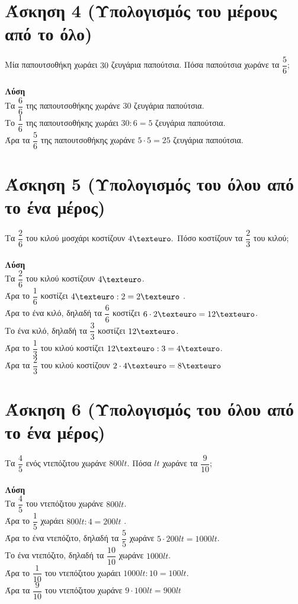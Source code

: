 \documentclass[a4paper,10pt]{report}
\begin{document}
\section*{Άσκηση 4 (Υπολογισμός του μέρους από το όλο)\hfill \small{}}
Μία παπουτσοθήκη χωράει $30$ ζευγάρια παπούτσια. Πόσα παπούτσια χωράνε τα  $\dfrac{5}{6}$; \\ \\
\textbf{Λύση}\\
Τα $\dfrac{6}{6}$ της παπουτσοθήκης χωράνε $30$ ζευγάρια παπούτσια.\\
Το $\dfrac{1}{6}$ της παπουτσοθήκης χωράει $30:6=5$ ζευγάρια παπούτσια.\\
Άρα τα $\dfrac{5}{6}$ της παπουτσοθήκης χωράνε $5\cdot 5=25$ ζευγάρια παπούτσια.




\section*{Άσκηση 5 (Υπολογισμός του όλου από το ένα μέρος)\hfill \small{}}
Τα $\dfrac{2}{6}$ του κιλού μοσχάρι κοστίζουν $4\texteuro.$ Πόσο κοστίζουν τα $\dfrac{2}{3}$ του κιλού;\\ \\
\textbf{Λύση}\\
Τα $\dfrac{2}{6}$ του κιλού κοστίζουν $4\texteuro$.\\
Άρα το $\dfrac{1}{6}$ κοστίζει $4\texteuro:2=2\texteuro$ .\\
     Άρα  το ένα κιλό, δηλαδή τα $\dfrac{6}{6}$ κοστίζει $6\cdot 2\texteuro=12\texteuro$.\\
       Το ένα κιλό, δηλαδή τα $\dfrac{3}{3}$ κοστίζει $12\texteuro$.\\
      Άρα το $\dfrac{1}{3}$ του κιλού κοστίζει $12\texteuro :3=4\texteuro$.\\
       Άρα τα $\dfrac{2}{3}$ του κιλού κοστίζουν $2\cdot 4\texteuro=8\texteuro$

\section*{Άσκηση 6 (Υπολογισμός του όλου από το ένα μέρος)\hfill \small{}}
Τα $\dfrac{4}{5}$ ενός ντεπόζιτου χωράνε  $800lt$. Πόσα $lt$ χωράνε τα $\dfrac{9}{10}$;\\ \\
\textbf{Λύση}\\
Τα $\dfrac{4}{5}$ του ντεπόζιτου χωράνε $800lt$.\\
Άρα το $\dfrac{1}{5}$ χωράει $800lt:4=200lt$ .\\
     Άρα  το ένα ντεπόζιτο, δηλαδή τα $\dfrac{5}{5}$ χωράνε $5\cdot 200lt=1000lt$.\\
       Το ένα ντεπόζιτο, δηλαδή τα $\dfrac{10}{10}$ χωράνε $1000lt$.\\
      Άρα το $\dfrac{1}{10}$ του ντεπόζιτου χωράει $1000lt :10=100lt$.\\
       Άρα τα $\dfrac{9}{10}$ του ντεπόζιτου χωράνε $9\cdot 100lt=900lt$
\end{document}
